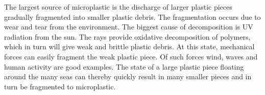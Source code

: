 The largest source of microplastic is the discharge of larger plastic pieces gradually fragmented into smaller plastic debris. The fragmentation occurs due to wear and tear from the environment. The biggest cause of decomposition is UV radiation from the sun. The rays provide oxidative decomposition of polymers, which in turn will give weak and brittle plastic debris. At this state, mechanical forces can easily fragment the weak plastic piece. Of such forces wind, waves and human activity are good examples. The state of a large plastic piece floating around the many seas can thereby quickly result in many smaller pieces and in turn be fragmented to microplastic.


